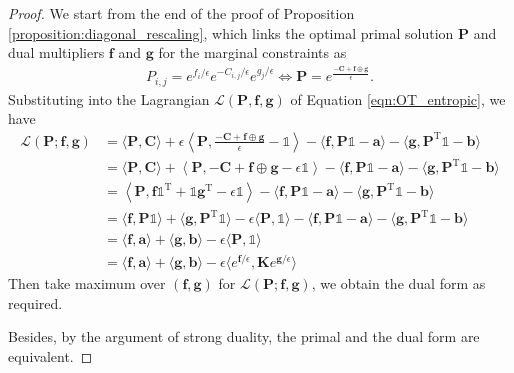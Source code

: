 \documentclass[11pt]{book}
\begin{document}
\begin{proof}
    We start from the end of the proof of Proposition \ref{proposition:diagonal_rescaling}, which links the optimal primal solution $\mathbf{P}$ and dual multipliers $\mathbf{f}$ and $\mathbf{g}$ for the marginal constraints as
    \begin{align*}
        P_{i,j} = e^{f_i / \epsilon} e^{-C_{i,j} / \epsilon} e^{g_j / \epsilon} \Leftrightarrow \mathbf{P} = e^{\frac{-\mathbf{C}+\mathbf{f}\oplus\mathbf{g}}{\epsilon}}.
    \end{align*}
    Substituting into the Lagrangian $\mathcal{L}(\mathbf{P}, \mathbf{f}, \mathbf{g})$ of Equation \eqref{eqn:OT_entropic}, we have
    \begin{align*}
        \mathcal{L}(\mathbf{P};\mathbf{f},\mathbf{g}) & = \langle \mathbf{P}, \mathbf{C}  \rangle + \epsilon \left\langle \mathbf{P}, \frac{-\mathbf{C}+\mathbf{f}\oplus\mathbf{g}}{\epsilon} - \mathbb{1}  \right\rangle  - \langle \mathbf{f}, \mathbf{P} \mathbb{1} - \mathbf{a} \rangle - \langle \mathbf{g}, \mathbf{P}^{\mathrm{T}} \mathbb{1} - \mathbf{b} \rangle \\
        & = \langle \mathbf{P}, \mathbf{C}  \rangle + \left\langle \mathbf{P}, -\mathbf{C}+\mathbf{f}\oplus\mathbf{g} - \epsilon\mathbb{1}  \right\rangle  - \langle \mathbf{f}, \mathbf{P} \mathbb{1} - \mathbf{a} \rangle - \langle \mathbf{g}, \mathbf{P}^{\mathrm{T}} \mathbb{1} - \mathbf{b} \rangle \\
        & = \left\langle \mathbf{P}, \mathbf{f}\mathbb{1}^{\mathrm{T}}+\mathbb{1}\mathbf{g}^{\mathrm{T}} - \epsilon\mathbb{1}  \right\rangle - \langle \mathbf{f}, \mathbf{P} \mathbb{1} - \mathbf{a} \rangle - \langle \mathbf{g}, \mathbf{P}^{\mathrm{T}} \mathbb{1} - \mathbf{b} \rangle \\
        & = \langle \mathbf{f}, \mathbf{P}\mathbb{1} \rangle + \langle \mathbf{g}, \mathbf{P}^{\mathrm{T}}\mathbb{1} \rangle - \epsilon \langle \mathbf{P}, \mathbb{1} \rangle - \langle \mathbf{f}, \mathbf{P} \mathbb{1} - \mathbf{a} \rangle - \langle \mathbf{g}, \mathbf{P}^{\mathrm{T}} \mathbb{1} - \mathbf{b} \rangle \\
        & = \langle \mathbf{f}, \mathbf{a} \rangle + \langle \mathbf{g}, \mathbf{b} \rangle - \epsilon \langle \mathbf{P}, \mathbb{1} \rangle  \\
        & = \langle \mathbf{f}, \mathbf{a} \rangle + \langle \mathbf{g}, \mathbf{b} \rangle - \epsilon \langle e^{\mathbf{f}/\epsilon}, \mathbf{K}e^{\mathbf{g}/\epsilon} \rangle
    \end{align*}
    Then take maximum over $(\mathbf{f},\mathbf{g})$ for $\mathcal{L}(\mathbf{P};\mathbf{f},\mathbf{g})$, we obtain the dual form as required.

    Besides, by the argument of strong duality, the primal and the dual form are equivalent.
\end{proof}
    
\end{document}

